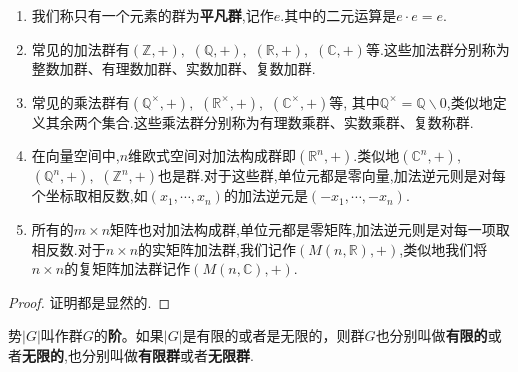 \documentclass[../../main.tex]{subfiles}
\begin{document}
\begin{example}[$\,\,$常见的群]
\begin{enumerate}
\item 我们称只有一个元素的群为\textbf{平凡群},记作${e}$.其中的二元运算是$e\cdot e=e$.
\item 常见的加法群有$(\mathbb{Z},+),$ $(\mathbb{Q},+),$ $(\mathbb{R},+),$ $(\mathbb{C},+)$等.这些加法群分别称为整数加群、有理数加群、实数加群、复数加群.
\item 常见的乘法群有$(\mathbb{Q}^\times,+),$ $(\mathbb{R}^\times,+),$ $(\mathbb{C}^\times,+)$等, 其中$\mathbb{Q}^\times=\mathbb{Q}\backslash {0}$,类似地定义其余两个集合.这些乘法群分别称为有理数乘群、实数乘群、复数称群.
\item 在向量空间中,$n$维欧式空间对加法构成群即$(\mathbb{R}^n,+)$.类似地$(\mathbb{C}^n,+),$ $(\mathbb{Q}^n,+),$ $(\mathbb{Z}^n,+)$也是群.对于这些群,单位元都是零向量,加法逆元则是对每个坐标取相反数,如$(x_1,\cdots,x_n)$的加法逆元是$(-x_1,\cdots,-x_n)$.
\item 所有的$m\times n$矩阵也对加法构成群,单位元都是零矩阵,加法逆元则是对每一项取相反数.对于$n\times n$的实矩阵加法群,我们记作$(M(n,\mathbb{R}),+)$,类似地我们将$n\times n$的复矩阵加法群记作$(M(n,\mathbb{C}),+)$.
\end{enumerate}
\end{example}
\begin{proof}
证明都是显然的.
\end{proof}

\begin{definition}[阶]
势$|G|$叫作群$G$的\textbf{阶}。如果$|G|$是有限的或者是无限的，则群$G$也分别叫做\textbf{有限的}或者\textbf{无限的},也分别叫做\textbf{有限群}或者\textbf{无限群}. 
\end{definition}
\end{document}

